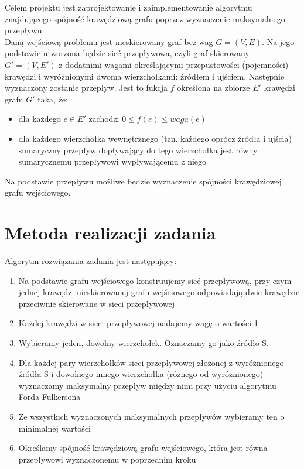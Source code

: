 \documentclass{article}
\begin{document}
Celem projektu jest zaprojektowanie i zaimplementowanie algorytmu znajdującego spójność krawędziową grafu poprzez wyznaczenie maksymalnego przepływu.\\

Daną wejściową problemu jest nieskierowany graf bez wag $G=(V,E)$. Na jego podstawie utworzona będzie sieć przepływowa, czyli graf skierowany $G'=(V,E')$ z dodatnimi wagami określającymi przepustowości (pojemności) krawędzi i wyróżnionymi dwoma wierzchołkami: źródłem i ujściem. Następnie wyznaczony zostanie przepływ. Jest to fukcja $f$ określona na zbiorze $E'$ krawędzi grafu $G'$ taka, że:
\begin{itemize}
    \item dla każdego $e\in E'$ zachodzi $0\le f(e)\le waga(e)$
    \item dla każdego wierzchołka wewnętrznego (tzn. każdego oprócz źródła i ujścia) sumaryczny przepływ dopływający do tego wierzchołka jest równy sumarycznemu przepływowi wypływającemu z niego
\end{itemize}
Na podstawie przepływu możliwe będzie wyznaczenie spójności krawędziowej grafu wejściowego.


\section{Metoda realizacji zadania}

Algorytm rozwiązania zadania jest następujący:
\begin{enumerate}
\item Na podstawie grafu wejściowego konstruujemy sieć przepływową, przy czym jednej krawędzi nieskierowanej grafu wejściowego odpowiadają dwie krawędzie przeciwnie skierowane w sieci przepływowej
\item Każdej krawędzi w sieci przepływowej nadajemy wagę o wartości 1
\item Wybieramy jeden, dowolny wierzchołek. Oznaczamy go jako źródło S.
\item Dla każdej pary wierzchołków sieci przepływowej złożonej z wyróżnionego źródła S i dowolnego innego wierzchołka (różnego od wyróżnionego) wyznaczamy maksymalny przepływ między nimi przy użyciu algorytmu Forda-Fulkersona
\item Ze wszystkich wyznaczonych maksymalnych przepływów wybieramy ten o minimalnej wartości
\item Określamy spójność krawędziową grafu wejściowego, która jest równa przepływowi wyznaczonemu w poprzednim kroku
\end{enumerate}
\end{document}
